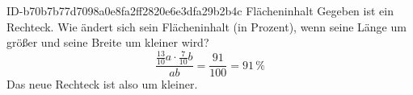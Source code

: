 \begin{exercise}
      {ID-b70b7b77d7098a0e8fa2ff2820e6e3dfa29b2b4c}
      {Flächeninhalt}
  \ifproblem\problem
    Gegeben ist ein Rechteck. Wie ändert sich sein Flächeninhalt (in Prozent),
    wenn seine Länge um  größer und seine Breite um  kleiner wird?
  \fi
  \ifoutcome\outcome
    \begin{equation*}
      \frac{\frac{13}{10}a\cdot\frac{7}{10}b}{ab}
      =\frac{91}{100}=91\,\text{\%}
    \end{equation*}
    Das neue Rechteck ist also um  kleiner.
  \fi
\end{exercise}
